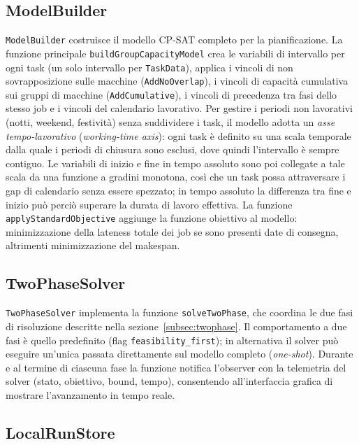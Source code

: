 \subsection{ModelBuilder}
\label{subsec:modelbuilder}

\texttt{ModelBuilder} costruisce il modello CP-SAT completo per la pianificazione. La funzione principale \texttt{buildGroupCapacityModel} crea le variabili di intervallo per ogni task (un solo intervallo per \texttt{TaskData}), applica i vincoli di non sovrapposizione sulle macchine (\texttt{AddNoOverlap}), i vincoli di capacità cumulativa sui gruppi di macchine (\texttt{AddCumulative}), i vincoli di precedenza tra fasi dello stesso job e i vincoli del calendario lavorativo. Per gestire i periodi non lavorativi (notti, weekend, festività) senza suddividere i task, il modello adotta un \textit{asse tempo-lavorativo} (\textit{working-time axis}): ogni task è definito su una scala temporale dalla quale i periodi di chiusura sono esclusi, dove quindi l'intervallo è sempre contiguo. Le variabili di inizio e fine in tempo assoluto sono poi collegate a tale scala da una funzione a gradini monotona, così che un task possa attraversare i gap di calendario senza essere spezzato; in tempo assoluto la differenza tra fine e inizio può perciò superare la durata di lavoro effettiva. La funzione \texttt{applyStandardObjective} aggiunge la funzione obiettivo al modello: minimizzazione della lateness totale dei job se sono presenti date di consegna, altrimenti minimizzazione del makespan.

\subsection{TwoPhaseSolver}
\label{subsec:twophasesolver}

\texttt{TwoPhaseSolver} implementa la funzione \texttt{solveTwoPhase}, che coordina le due fasi di risoluzione descritte nella sezione~\ref{subsec:twophase}. Il comportamento a due fasi è quello predefinito (flag \texttt{feasibility\_first}); in alternativa il solver può eseguire un'unica passata direttamente sul modello completo (\textit{one-shot}). Durante e al termine di ciascuna fase la funzione notifica l'observer con la telemetria del solver (stato, obiettivo, bound, tempo), consentendo all'interfaccia grafica di mostrare l'avanzamento in tempo reale.

\subsection{LocalRunStore}
\label{subsec:localrunstore}

